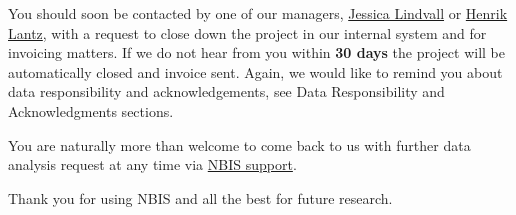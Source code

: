 \documentclass[
]{book}
\begin{document}
You should soon be contacted by one of our managers, \href{jessica.lindvall@nbis.se}{Jessica Lindvall} or \href{henrik.lantz@nbis.se}{Henrik Lantz}, with a request to close down the project in our internal system and for invoicing matters. If we do not hear from you within \textbf{30 days} the project will be automatically closed and invoice sent. Again, we would like to remind you about data responsibility and acknowledgements, see Data Responsibility and Acknowledgments sections.

You are naturally more than welcome to come back to us with further data analysis request at any time via \href{http://nbis.se/support/support.html}{NBIS support}.

Thank you for using NBIS and all the best for future research.
\end{document}
